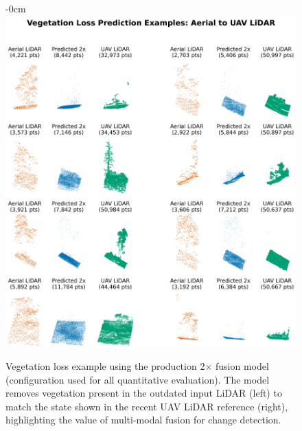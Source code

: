 \documentclass[remotesensing,article,submit,pdftex,moreauthors]{Definitions/mdpi}
\newenvironment{widefigure}[1][]{%
  \begin{figure}[#1]\begin{adjustwidth}{-\extralength}{0cm}\centering}{%
  \end{adjustwidth}\end{figure}}
\begin{document}
\begin{widefigure}[H]
    \centering
    \includegraphics[width=1\linewidth]{manuscript/figures/veg_loss_2x.png}
  \caption{Vegetation loss example using the production 2$\times$ fusion model (configuration used for all quantitative evaluation). The model removes vegetation present in the outdated input LiDAR (left) to match the state shown in the recent UAV LiDAR reference (right), highlighting the value of multi-modal fusion for change detection.}
   \label{fig:appendix_loss}
\end{widefigure}
\end{document}
